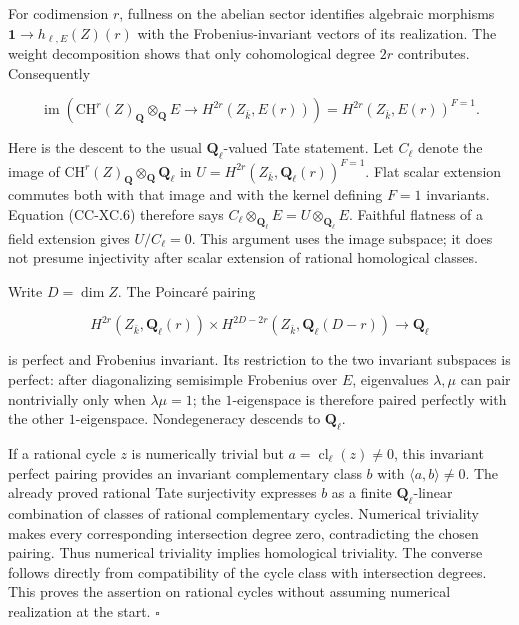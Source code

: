 \documentclass[11pt,a4paper]{article}
\theoremstyle{definition}\newtheorem{definition}[theorem]{Definition}
\theoremstyle{remark}\newtheorem{remark}[theorem]{Remark}
\begin{document}
For codimension \(r\), fullness on the abelian sector identifies
algebraic morphisms \(\mathbf 1\to h_{\ell,E}(Z)(r)\) with the
Frobenius-invariant vectors of its realization. The weight decomposition
shows that only cohomological degree \(2r\) contributes. Consequently

\[
 \operatorname{im}\!\left(
 \mathrm{CH}^r(Z)_{\mathbf Q}\otimes_{\mathbf Q}E
 \longrightarrow H^{2r}(Z_{\bar k},E(r))
 \right)
 =H^{2r}(Z_{\bar k},E(r))^{F=1}.                 \tag{CC-XC.6}
\]

Here is the descent to the usual \(\mathbf Q_\ell\)-valued Tate
statement. Let \(C_\ell\) denote the image of
\(\mathrm{CH}^r(Z)_{\mathbf Q}\otimes_{\mathbf Q}\mathbf Q_\ell\) in
\(U=H^{2r}(Z_{\bar k},\mathbf Q_\ell(r))^{F=1}\). Flat scalar extension
commutes both with that image and with the kernel defining \(F=1\)
invariants. Equation (CC-XC.6) therefore says
\(C_\ell\otimes_{\mathbf Q_\ell}E=U\otimes_{\mathbf Q_\ell}E\). Faithful
flatness of a field extension gives \(U/C_\ell=0\). This argument uses
the image subspace; it does not presume injectivity after scalar
extension of rational homological classes.

Write \(D=\dim Z\). The Poincaré pairing

\[
 H^{2r}(Z_{\bar k},\mathbf Q_\ell(r))
 \times
 H^{2D-2r}(Z_{\bar k},\mathbf Q_\ell(D-r))
 \longrightarrow\mathbf Q_\ell
\]

is perfect and Frobenius invariant. Its restriction to the two invariant
subspaces is perfect: after diagonalizing semisimple Frobenius over
\(E\), eigenvalues \(\lambda,\mu\) can pair nontrivially only when
\(\lambda\mu=1\); the \(1\)-eigenspace is therefore paired perfectly
with the other \(1\)-eigenspace. Nondegeneracy descends to
\(\mathbf Q_\ell\).

If a rational cycle \(z\) is numerically trivial but
\(a=\operatorname{cl}_\ell(z)\ne0\), this invariant perfect pairing
provides an invariant complementary class \(b\) with
\(\langle a,b\rangle\ne0\). The already proved rational Tate
surjectivity expresses \(b\) as a finite \(\mathbf Q_\ell\)-linear
combination of classes of rational complementary cycles. Numerical
triviality makes every corresponding intersection degree zero,
contradicting the chosen pairing. Thus numerical triviality implies
homological triviality. The converse follows directly from compatibility
of the cycle class with intersection degrees. This proves the assertion
on rational cycles without assuming numerical realization at the start.
\(\square\)
\end{document}
